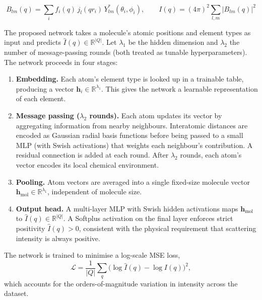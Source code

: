 \documentclass[final]{article}
\begin{document}
\begin{equation}
    B_{lm}(q) = \sum_i f_i(q)\,j_l(qr_i)\,Y^*_{lm}(\theta_i,\phi_i),
    \qquad
    I(q) = (4\pi)^2 \sum_{l,m} |B_{lm}(q)|^2
    \label{eq:stuhrmann}
\end{equation}

The proposed network takes a molecule's atomic positions and element types as input and
predicts $\hat{I}(q) \in \mathbb{R}^{|Q|}$. Let $\lambda_1$ be the hidden dimension and
$\lambda_2$ the number of message-passing rounds (both treated as tunable hyperparameters).
The network proceeds in four stages:

\begin{enumerate}
    \item \textbf{Embedding.} Each atom's element type is looked up in a trainable table,
    producing a vector $\mathbf{h}_i \in \mathbb{R}^{\lambda_1}$. This gives the network a
    learnable representation of each element.

    \item \textbf{Message passing ($\lambda_2$ rounds).} Each atom updates its vector by
    aggregating information from nearby neighbours. Interatomic distances are encoded as
    Gaussian radial basis functions before being passed to a small MLP (with Swish activations)
    that weights each neighbour's contribution. A residual connection is added at each round.
    After $\lambda_2$ rounds, each atom's vector encodes its local chemical environment.

    \item \textbf{Pooling.} Atom vectors are averaged into a single fixed-size molecule
    vector $\mathbf{h}_{\mathrm{mol}} \in \mathbb{R}^{\lambda_1}$, independent of molecule size.

    \item \textbf{Output head.} A multi-layer MLP with Swish hidden activations maps
    $\mathbf{h}_{\mathrm{mol}}$ to $\hat{I}(q) \in \mathbb{R}^{|Q|}$. A Softplus activation
    on the final layer enforces strict positivity $\hat{I}(q) > 0$, consistent with the
    physical requirement that scattering intensity is always positive.
\end{enumerate}

The network is trained to minimise a log-scale MSE loss,
\begin{equation}
    \mathcal{L} = \frac{1}{|Q|}\sum_{q}
    \bigl(\log\hat{I}(q) - \log I(q)\bigr)^2,
\end{equation}
which accounts for the orders-of-magnitude variation in intensity across the dataset.
\end{document}
